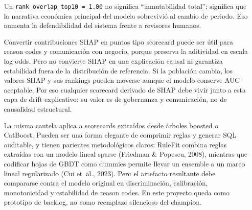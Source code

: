 \documentclass[
  spanish,
  11pt,
  letterpaper,
]{scrbook}
\theoremstyle{plain}
\theoremstyle{remark}
\begin{document}
\begin{tcolorbox}[enhanced jigsaw, arc=.35mm, bottomrule=.15mm, bottomtitle=1mm, breakable, colback=white, colbacktitle=quarto-callout-tip-color!10!white, colframe=quarto-callout-tip-color-frame, coltitle=black, left=2mm, leftrule=.75mm, opacityback=0, opacitybacktitle=0.6, rightrule=.15mm, title=\textcolor{quarto-callout-tip-color}{\faLightbulb}\hspace{0.5em}{Señal de confianza}, titlerule=0mm, toprule=.15mm, toptitle=1mm]

Un \texttt{rank\_overlap\_top10\ =\ 1.00} no significa ``inmutabilidad
total''; significa que la narrativa económica principal del modelo
sobrevivió al cambio de periodo. Eso aumenta la defendibilidad del
sistema frente a revisores humanos.

\end{tcolorbox}

\begin{tcolorbox}[enhanced jigsaw, arc=.35mm, bottomrule=.15mm, bottomtitle=1mm, breakable, colback=white, colbacktitle=quarto-callout-note-color!10!white, colframe=quarto-callout-note-color-frame, coltitle=black, left=2mm, leftrule=.75mm, opacityback=0, opacitybacktitle=0.6, rightrule=.15mm, title=\textcolor{quarto-callout-note-color}{\faInfo}\hspace{0.5em}{SHAP-scorecards y estabilidad}, titlerule=0mm, toprule=.15mm, toptitle=1mm]

Convertir contribuciones SHAP en puntos tipo scorecard puede ser útil
para reason codes y comunicación con negocio, porque preserva la
aditividad en escala log-odds. Pero no convierte SHAP en una explicación
causal ni garantiza estabilidad fuera de la distribución de referencia.
Si la población cambia, los valores SHAP y sus rankings pueden moverse
aunque el modelo conserve AUC aceptable. Por eso cualquier scorecard
derivado de SHAP debe vivir junto a esta capa de drift explicativo: su
valor es de gobernanza y comunicación, no de causalidad estructural.

La misma cautela aplica a scorecards extraídos desde árboles boosted o
CatBoost. Pueden ser una forma elegante de comprimir reglas y generar
SQL auditable, y tienen parientes metodológicos claros: RuleFit combina
reglas extraídas con un modelo lineal sparse (Friedman \& Popescu,
2008), mientras que codificar hojas de GBDT como dummies permite llevar
un ensemble a un marco lineal regularizado (Cui et~al., 2023). Pero el
artefacto resultante debe compararse contra el modelo original en
discriminación, calibración, monotonicidad y estabilidad de reason
codes. En este proyecto queda como prototipo de backlog, no como
reemplazo silencioso del champion.

\end{tcolorbox}
\end{document}
